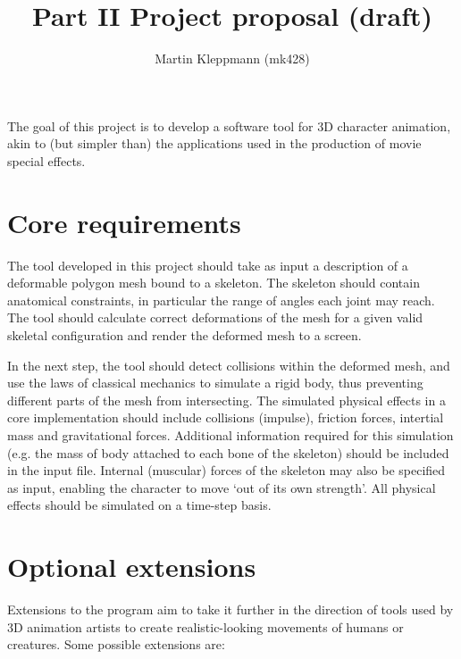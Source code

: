 \documentclass{article}
\begin{document}
\title{Part II Project proposal (draft)}
\author{Martin Kleppmann (mk428)}
\maketitle

The goal of this project is to develop a software tool for 3D character
animation, akin to (but simpler than) the applications used in the
production of movie special effects.

\section{Core requirements}

The tool developed in this project should take as input a description
of a deformable polygon mesh bound to a skeleton. The skeleton should
contain anatomical constraints, in particular the range of angles each
joint may reach. The tool should calculate correct deformations of the
mesh for a given valid skeletal configuration and render the deformed
mesh to a screen.

In the next step, the tool should detect collisions within the
deformed mesh, and use the laws of classical mechanics to simulate a
rigid body, thus preventing different parts of the mesh from
intersecting. The simulated physical effects in a core implementation
should include collisions (impulse), friction forces, intertial mass
and gravitational forces. Additional information required for this
simulation (e.g. the mass of body attached to each bone of the
skeleton) should be included in the input file. Internal (muscular)
forces of the skeleton may also be specified as input, enabling the
character to move `out of its own strength'. All physical effects
should be simulated on a time-step basis.


\section{Optional extensions}

Extensions to the program aim to take it further in the direction of
tools used by 3D animation artists to create realistic-looking
movements of humans or creatures. Some possible extensions are:
\end{document}
